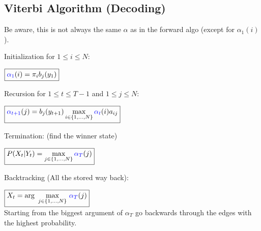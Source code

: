 \begin{minipage}[t]{0.49\textwidth}
\subsection{Viterbi Algorithm (Decoding)}
Be aware, this is not always the same $\alpha$ as in the forward algo (except for $\alpha_1(i)$).
\begin{aufzaehlung}
	\item Initialization for $1\leq i \leq N$:\\
	
	\vspace{-0.3cm}
	
	$\boxed{\textcolor{blue}{\alpha_1}(i)=\pi_i b_j(y_{1})}$
	\item Recursion for $1\leq t\leq T-1$ and $1\leq j \leq N$:\\
			
		\vspace{-0.3cm}
		
		$\boxed{\textcolor{blue}{\alpha_{t+1}}(j)=b_{j}(y_{t+1}) \max\limits_{i \in \{1,\ldots,N\}}{\textcolor{blue}{\alpha_t}(i)a_{ij}}}$
		
		\item Termination: (find the winner state)\\
			
		\vspace{-0.3cm}
		
		$\boxed{P(X_t|Y_t)=\max\limits_{j \in \{1,\ldots,N\}}{\textcolor{blue}{\alpha_T}(j)}}$
	\item Backtracking (All the stored way back):\\
				
		\vspace{-0.3cm}
			
		$\boxed{X_t=\arg~ \underset{j \in \{1,\ldots,N\}}{\max}~{\textcolor{blue}{\alpha_T}(j)}}$\\
		Starting from the biggest argument of $\alpha_T$ go backwards through the edges with the highest probability.
\end{aufzaehlung}	 
\end{minipage}
\hfill
